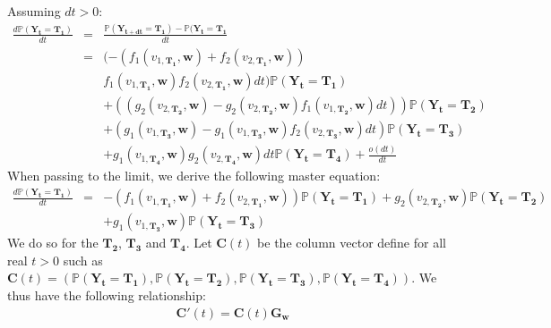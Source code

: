 Assuming $dt>0$:
\begin{eqnarray}
\label{eqAnn2_5.4}
\nonumber \frac{d\mathbb{P}(\mathbf{Y_t}=\mathbf{T_1})}{dt} &=&
\frac{\mathbb{P}(\mathbf{Y_{t+dt}}=\mathbf{T_1}) - \mathbb{P}(\mathbf{Y_t}=\mathbf{T_1}}{dt}  \\
\nonumber &=& (-(f_1(v_{1,\mathbf{T_1}},\mathbf{w})+f_2(v_{2,\mathbf{T_1}},\mathbf{w})) \\
\nonumber & & f_1(v_{1,\mathbf{T_1}},\mathbf{w})f_2(v_{2,\mathbf{T_1}},\mathbf{w})dt)\mathbb{P}(\mathbf{Y_t}=\mathbf{T_1})\\
\nonumber & & + ((g_2(v_{2,\mathbf{T_2}},\mathbf{w})-g_2(v_{2,\mathbf{T_2}},\mathbf{w})f_1(v_{1,\mathbf{T_2}},\mathbf{w})dt))\mathbb{P}(\mathbf{Y_t}=\mathbf{T_2}) \\
\nonumber & & + (g_1(v_{1,\mathbf{T_3}},\mathbf{w})-g_1(v_{1,\mathbf{T_3}},\mathbf{w})f_2(v_{2,\mathbf{T_3}},\mathbf{w})dt)\mathbb{P}(\mathbf{Y_t}=\mathbf{T_3}) \\
& & +g_1(v_{1,\mathbf{T_4}},\mathbf{w})g_2(v_{2,\mathbf{T_4}},\mathbf{w})dt\mathbb{P}(\mathbf{Y_t}=\mathbf{T_4})+\frac{o(dt)}{dt}
\end{eqnarray}
When passing to the limit, we derive the following master equation:
\begin{eqnarray}
\label{eqAnn2_5.5} \nonumber\frac{d\mathbb{P}(\mathbf{Y_t}=\mathbf{T_1})}{dt} &=& -(f_1(v_{1,\mathbf{T_1}},\mathbf{w})+f_2(v_{2,\mathbf{T_1}},\mathbf{w}))\mathbb{P}(\mathbf{Y_t}=\mathbf{T_1}) +g_2(v_{2,\mathbf{T_2}},\mathbf{w})\mathbb{P}(\mathbf{Y_t}=\mathbf{T_2})\\ & &  + g_1(v_{1,\mathbf{T_3}},\mathbf{w})\mathbb{P}(\mathbf{Y_t}=\mathbf{T_3})
\end{eqnarray}
We do so for the $\mathbf{T_2}$, $\mathbf{T_3}$ and $\mathbf{T_4}$. Let $\mathbf{C}(t)$ be the column vector define for all real $t>0$ such as $\mathbf{C}(t)=(\mathbb{P}(\mathbf{Y_t}=\mathbf{T_1}),\mathbb{P}(\mathbf{Y_t}=\mathbf{T_2}),\mathbb{P}(\mathbf{Y_t}=\mathbf{T_3}),
\mathbb{P}(\mathbf{Y_t}=\mathbf{T_4}))$.
We thus have the following relationship:
\begin{eqnarray}
\label{eqAnn2_5.6} \mathbf{C}'(t)=\mathbf{C}(t)\mathbf{G_w}
\end{eqnarray}

